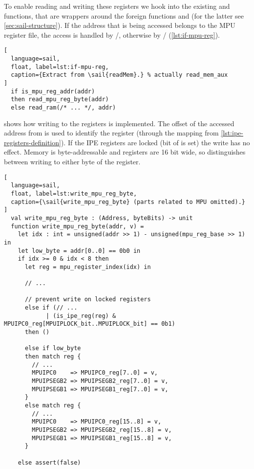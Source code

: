 To enable reading and writing these registers we hook into the existing  and  functions, that are wrappers around the foreign functions  and  (for the latter see \cref{sec:sail-structure}). If the address that is being accessed belongs to the MPU register file, the access is handled by /, otherwise by / (\cref{lst:if-mpu-reg}).

\begin{lstlisting}[
  language=sail,
  float, label=lst:if-mpu-reg,
  caption={Extract from \sail{readMem}.} % actually read_mem_aux
]
  if is_mpu_reg_addr(addr)
  then read_mpu_reg_byte(addr)
  else read_ram(/* ... */, addr)
\end{lstlisting}

 shows how writing to the registers is implemented. The offset  of the accessed address from  is used to identify the register (through the  mapping from \cref{lst:ipe-registers-definition}). If the IPE registers are locked (\ie bit  of  is set) the write has no effect. Memory is byte-addressable and registers are 16 bit wide, so  distinguishes between writing to either byte of the register.

\begin{lstlisting}[
  language=sail,
  float, label=lst:write_mpu_reg_byte,
  caption={\sail{write_mpu_reg_byte} (parts related to MPU omitted).}
]
  val write_mpu_reg_byte : (Address, byteBits) -> unit
  function write_mpu_reg_byte(addr, v) =
    let idx : int = unsigned(addr >> 1) - unsigned(mpu_reg_base >> 1) in
    let low_byte = addr[0..0] == 0b0 in
    if idx >= 0 & idx < 8 then
      let reg = mpu_register_index(idx) in

      // ...

      // prevent write on locked registers
      else if (// ...
            | (is_ipe_reg(reg) & MPUIPC0_reg[MPUIPLOCK_bit..MPUIPLOCK_bit] == 0b1)
      then ()

      else if low_byte
      then match reg {
        // ...
        MPUIPC0    => MPUIPC0_reg[7..0] = v,
        MPUIPSEGB2 => MPUIPSEGB2_reg[7..0] = v,
        MPUIPSEGB1 => MPUIPSEGB1_reg[7..0] = v,
      }
      else match reg {
        // ...
        MPUIPC0    => MPUIPC0_reg[15..8] = v,
        MPUIPSEGB2 => MPUIPSEGB2_reg[15..8] = v,
        MPUIPSEGB1 => MPUIPSEGB1_reg[15..8] = v,
      }

    else assert(false)
\end{lstlisting}

